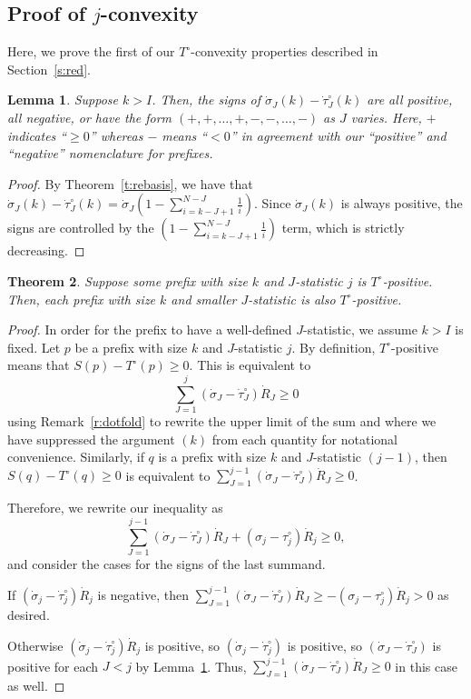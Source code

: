 \documentclass[11pt]{amsart}   %
\newtheorem{theorem}{Theorem}[section]
\newtheorem{lemma}[theorem]{Lemma}
\theoremstyle{definition}
\theoremstyle{remark}
\numberwithin{equation}{section}
\theoremstyle{theorem}
\begin{document}
\bigskip
\subsection{Proof of $j$-convexity}\label{s:jconvex}

Here, we prove the first of our $T^\circ$-convexity properties described in Section~\ref{s:red}.

\begin{lemma}\label{l:sp_j}
Suppose $k > I$.  Then, the signs of $\dot\sigma_J(k) - \dot\tau^\circ_J(k)$
are all positive, all negative, or have the form $(+, +, \ldots, +, -, -,
\ldots, -)$ as $J$ varies.  Here, $+$ indicates ``$\geq 0$'' whereas $-$ means
``$< 0$'' in agreement with our ``positive'' and ``negative'' nomenclature for
prefixes.
\end{lemma}
\begin{proof}
By Theorem~\ref{t:rebasis}, we have that $\dot\sigma_J(k) - \dot\tau^\circ_J(k) = \dot\sigma_J \left(1 - \sum_{i=k-J+1}^{N-J} \frac{1}{i}\right)$.
Since $\dot\sigma_J(k)$ is always positive, the signs are controlled by the $\left(1 - \sum_{i=k-J+1}^{N-J} \frac{1}{i}\right)$ term, which is strictly decreasing.
\end{proof}

\begin{theorem}\label{t:jconvex}
Suppose some prefix with size $k$ and $J$-statistic $j$ is $T^\circ$-positive.  Then, each prefix with size $k$ and smaller $J$-statistic is also $T^\circ$-positive.
\end{theorem}
\begin{proof}
In order for the prefix to have a well-defined $J$-statistic, we assume $k > I$ is fixed.  Let $p$ be a prefix with size $k$ and $J$-statistic $j$.  By definition, $T^\circ$-positive means that $S(p) - T^\circ(p) \geq 0$.  This is equivalent to
\[ \sum_{J=1}^j (\dot\sigma_J - \dot\tau^\circ_J) \dot{R}_J \geq 0 \]
using Remark~\ref{r:dotfold} to rewrite the upper limit of the sum and where we have suppressed the argument $(k)$ from each quantity for notational convenience.  Similarly, if $q$ is a prefix with size $k$ and $J$-statistic $(j-1)$, then $S(q) - T^\circ(q) \geq 0$ is equivalent to $\sum_{J=1}^{j-1} (\dot\sigma_J - \dot\tau^\circ_J) \dot{R}_J \geq 0$.  

Therefore, we rewrite our inequality as
\[ \sum_{J=1}^{j-1} (\dot\sigma_J - \dot\tau^\circ_J) \dot{R}_J + (\sigma_j - \tau^\circ_j) \dot{R}_j \geq 0,  \]
and consider the cases for the signs of the last summand.

If $(\dot\sigma_j - \dot\tau^\circ_j) \dot{R}_j$ is negative, then
$\sum_{J=1}^{j-1} (\dot\sigma_J - \dot\tau^\circ_J) \dot{R}_J \geq -(\sigma_j - \tau^\circ_j) \dot{R}_j > 0$
as desired.

Otherwise $(\dot\sigma_j - \dot\tau^\circ_j) \dot{R}_j$ is positive, so $(\dot\sigma_j - \dot\tau^\circ_j)$ is positive, so $(\dot\sigma_J - \dot\tau^\circ_J)$ is positive for each $J < j$ by Lemma~\ref{l:sp_j}.  Thus, 
$\sum_{J=1}^{j-1} (\dot\sigma_J - \dot\tau^\circ_J) \dot{R}_J \geq 0$
in this case as well.
\end{proof}
\end{document}

